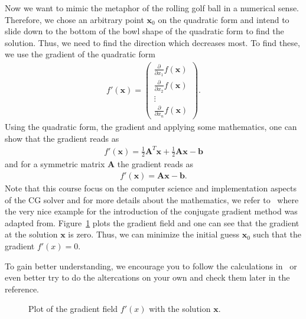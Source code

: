 \documentclass[11pt,fleqn]{book} %
\begin{document}
Now we want to mimic the metaphor of the rolling golf ball in a numerical sense. Therefore, we chose an arbitrary point $\mathbf{x}_0$ on the quadratic form and intend to slide down to the bottom of the bowl shape of the quadratic form to find the solution. Thus, we need to find the direction which decreases most. To find these, we use the gradient of the quadratic form
\begin{align}
f'(\mathbf{x})=\begin{pmatrix}
\frac{\partial }{\partial x_1} f(\mathbf{x}) \\
\frac{\partial }{\partial x_2} f(\mathbf{x}) \\
\vdots \\
\frac{\partial }{\partial x_n} f(\mathbf{x})
\end{pmatrix}\text{.}
\end{align}
Using the quadratic form, the gradient and applying some mathematics, one can show that the gradient reads as
\begin{align}
f'(\mathbf{x}) = \frac{1}{2} \mathbf{A}^T \mathbf{x} + \frac{1}{2} \mathbf{A} \mathbf{x}-\mathbf{b}
\end{align}
and for a symmetric matrix $\mathbf{A}$ the gradient reads as
\begin{align}
f'(\mathbf{x})= \mathbf{A}\mathbf{x}-\mathbf{b}\text{.}
\end{align}
Note that this course focus on the computer science and implementation aspects of the CG solver and for more details about the mathematics, we refer to~\cite{shewchuk1994introduction} where the very nice example for the introduction of the conjugate gradient method was adapted from. Figure~\ref{fig:gradient:field} plots the gradient field and one can see that the gradient at the solution $\mathbf{x}$ is zero. Thus, we can minimize the initial guess $\mathbf{x}_0$ such that the gradient $f'(x)=0$.\\

\begin{exercise}
To gain better understanding, we encourage you to follow the calculations in~\cite{shewchuk1994introduction} or even better try to do the altercations on your own and check them later in the reference.
\end{exercise}

\begin{figure}[tb]
\centering
{}
\caption{Plot of the gradient field  $f'(x)$ with the solution $\mathbf{x}$. }
\label{fig:gradient:field}
\end{figure}
\end{document}
